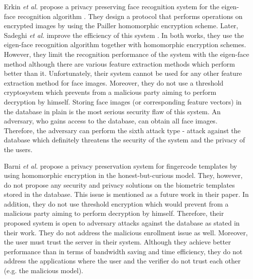 \documentclass[journal]{IEEEtran}
\begin{document}
Erkin \textit {et al.} \cite{Erkin} propose a privacy preserving face recognition system for the eigen-face recognition algorithm \cite{Turk}. They design a protocol that performs operations on encrypted images by using the Pailler homomorphic encryption scheme. Later, Sadeghi \textit{et al.}  improve the efficiency of this system \cite{Sadeghi}. In both works, they use the eigen-face recognition algorithm together with homomorphic encryption schemes. However, they limit the recognition performance of the system with the eigen-face method although there are various feature extraction methods which perform better than it. Unfortunately, their system cannot be used for any other feature extraction method for face images. Moreover, they do not use a threshold cryptosystem which prevents from a malicious party aiming to perform decryption by himself. Storing face images (or corresponding feature vectors) in the database in plain is the most serious security flaw of this system. An adversary, who gains access to the database, can obtain all face images. Therefore, the adversary can perform the sixth attack type - attack against the database which definitely threatens the security of the system and the privacy of the users.

Barni \textit {et al.} \cite{Barni, Barni2} propose a privacy preservation system for fingercode templates by using homomorphic encryption in the honest-but-curious model. They, however, do not propose any security and privacy solutions on the biometric templates stored in the database. This issue is mentioned as a future work in their paper. In addition, they do not use threshold encryption which would prevent from  a malicious party aiming to perform decryption by himself. Therefore, their proposed system is open to adversary attacks against the database as stated in their work. They do not address the malicious enrollment issue as well. Moreover, the user must trust the server in their system. Although they achieve better performance than \cite{Erkin, Sadeghi} in terms of bandwidth saving and time efficiency, they do not address the applications where the user and the verifier do not trust each other (e.g. the malicious model).
\end{document}
